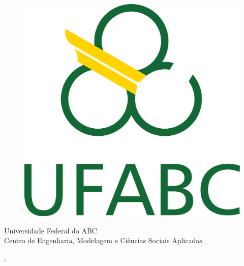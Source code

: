   \begin{capa}%
    \begin{figure}[h!]%
        \centering%
        \includegraphics[scale=1.2]{figs/logo.png}%
      \end{figure}%
    \center
	\ABNTEXchapterfont\large{Universidade Federal do ABC \\ Centro de Engenharia, Modelagem e Ciências Sociais Aplicadas}

    \vfill
    \ABNTEXchapterfont\bfseries\LARGE\imprimirtitulo
    \vfill

	\ABNTEXchapterfont\large\imprimirautor
	\vfill
%

	
    \large\imprimirlocal, \large\imprimirdata

    \vspace*{1cm}
  \end{capa}
